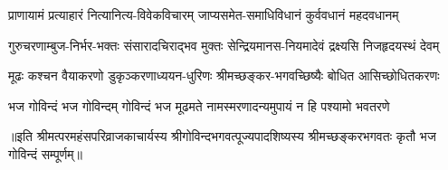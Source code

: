 \begin{large}
\begin{multicols}{2}
\begin{flushleft}
\fourlineindentedshloka
{प्राणायामं प्रत्याहारं}
{नित्यानित्य-विवेकविचारम्}
{जाप्यसमेत-समाधिविधानं}
{कुर्ववधानं महदवधानम्}

\fourlineindentedshloka
{गुरुचरणाम्बुज-निर्भर-भक्तः}
{संसारादचिराद्भव मुक्तः}
{सेन्द्रियमानस-नियमादेवं}
{द्रक्ष्यसि निजहृदयस्थं देवम्}

\fourlineindentedshloka
{मूढः कश्चन वैयाकरणो}
{डुकृञ्करणाध्ययन-धुरिणः}
{श्रीमच्छङ्कर-भगवच्छिष्यैः}
{बोधित आसिच्छोधितकरणः}

\fourlineindentedshloka
{भज गोविन्दं भज गोविन्दम्}
{गोविन्दं भज मूढमते}
{नामस्मरणादन्यमुपायं}
{न हि पश्यामो भवतरणे}

\fourlineshloka{}{}{}{}
\fourlineshloka{}{}{}{}
\end{flushleft}
\end{multicols}
॥इति श्रीमत्परमहंसपरिव्राजकाचार्यस्य श्रीगोविन्दभगवत्पूज्यपादशिष्यस्य 
श्रीमच्छङ्करभगवतः कृतौ भज गोविन्दं सम्पूर्णम्॥
\end{large}
\setlength{\shlokaspaceskip}{24pt}
\setlength{\columnseprule}{1pt}
\setlength{\columnsep}{30pt}